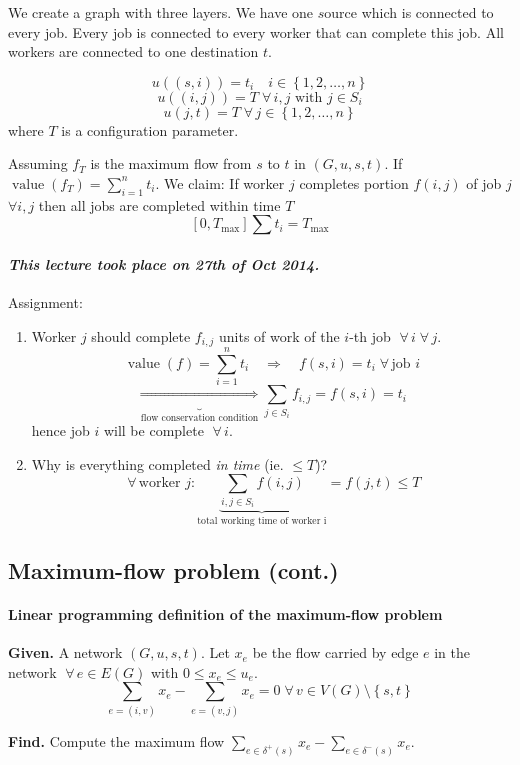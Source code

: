 \documentclass[a4paper]{article}
\theoremstyle{definition}
\newcommand{\set}[1]{\left\{#1\right\}}
\newcommand{\given}[1]{\textbf{Given.} #1\par}
\newcommand{\find}[1]{\textbf{Find.} #1\par}
\newcommand{\dateref}[1]{\paragraph{\textit{This lecture took place on #1.}}}
\newcommand{\fall}{\;\forall\,}
\begin{document}
We create a graph with three layers. We have one $s$ource which is connected to every job. Every job is connected to every worker that can complete this job. All workers are connected to one destination $t$.

\[
  u((s, i)) = t_i  \quad i \in \set{1, 2, \ldots, n}
\] \[
  u((i, j)) = T \fall i, j \text{ with } j \in S_i
\] \[
  u(j, t) = T \fall j \in \set{1, 2, \ldots, n}
\]
where $T$ is a configuration parameter.

Assuming $f_T$ is the maximum flow from $s$ to $t$ in $(G, u, s, t)$. If $\operatorname{value}(f_T) = \sum_{i=1}^n t_i$. We claim: If worker $j$ completes portion $f(i, j)$ of job $j$ $\forall i, j$ then all jobs are completed within time $T$
\[
  [0, T_\text{max}] \sum t_i = T_\text{max}
\]

\dateref{27th of Oct 2014}

Assignment:
\begin{enumerate}
  \item Worker $j$ should complete $f_{i,j}$ units of work of the $i$-th job $\fall i \fall j$.
    \[
      \operatorname{value}{(f)} = \sum_{i=1}^n t_i \quad\Rightarrow\quad f(s, i) = t_i
        \fall \text{job } i
    \] \[
      \underbrace{\Rightarrow}_{\text{flow conservation condition}}
        \sum_{j \in S_i} f_{i,j} = f(s, i) = t_i
    \]
    hence job $i$ will be complete $\fall i$.
  \item Why is everything completed \emph{in time} (ie. $\leq T$)?
    \[
      \fall \text{worker } j:
        \underbrace{\sum_{i,j \in S_i} f(i, j)}_{\text{total working time of worker i}}
        = f(j, t) \leq T
    \]
\end{enumerate}

\subsection{Maximum-flow problem (cont.)}

\paragraph{Linear programming definition of the maximum-flow problem}
%
\given{A network $(G, u, s, t)$. Let $x_e$ be the flow carried by edge $e$ in the network $\fall e \in E(G)$ with $0 \leq x_e \leq u_e$.
\[
  \sum_{e=(i,v)} x_e - \sum_{e=(v,j)} x_e = 0 \fall v \in V(G) \setminus \set{s, t}
\]}
\find{Compute the maximum flow $\sum_{e \in \delta^+(s)} x_e - \sum_{e \in \delta^-(s)} x_e$.}
\end{document}
